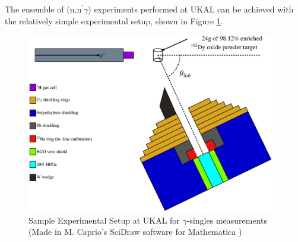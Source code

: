 The ensemble of (n,n$^\prime\gamma$) experiments performed at UKAL can be achieved with the relatively simple experimental setup, shown in Figure \ref{fig:ExpSetup}.

\begin{figure}[h!] 
\begin{center}
\includegraphics[width=0.97\textwidth]{SciDraw_ExpSetup_Dy.eps}
\caption{Sample Experimental Setup at UKAL for $\gamma$-singles measurements (Made in M. Caprio's SciDraw software for Mathematica \cite{Caprio2005107})}
\label{fig:ExpSetup}
\end{center}
\end{figure}

